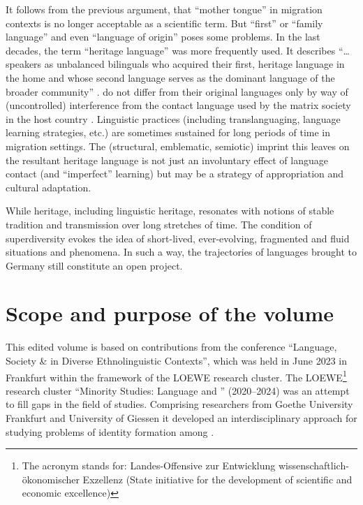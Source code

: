 \documentclass[output=paper,colorlinks,citecolor=brown]{langscibook}
\begin{document}
It follows from the previous argument, that ``mother tongue'' in migration contexts is no longer acceptable as a scientific term. But ``first'' or ``family language'' and even ``language of origin'' poses some problems. In the last decades, the term ``heritage language'' was more frequently used. It describes ``… speakers as unbalanced bilinguals who acquired their first, heritage language in the home and whose second language serves as the dominant language of the broader community'' \citep[152]{scontras_putnam2020}.  do not differ from their original languages only by way of (uncontrolled) interference from the contact language used by the matrix society in the host country \citep{polinsky2011,polinsky2018}. Linguistic practices (including translanguaging, language learning strategies, etc.) are sometimes sustained for long periods of time in migration settings. The (structural, emblematic, semiotic) imprint this leaves on the resultant heritage language is not just an involuntary effect of language contact (and ``imperfect'' learning) but may be a strategy of appropriation and cultural adaptation. 

While heritage, including linguistic heritage, resonates with notions of stable tradition and transmission over long stretches of time. The condition of superdiversity evokes the idea of short-lived, ever-evolving, fragmented and fluid situations and phenomena. In such a way, the trajectories of languages brought to Germany still constitute an open project.

\section{Scope and purpose of the volume}

This edited volume is based on contributions from the conference ``Language, Society \&  in Diverse Ethnolinguistic Contexts'', which was held in June 2023 in Frankfurt within the framework of the LOEWE research cluster.  The LOEWE\footnote{%
The acronym stands for: Landes-Offensive zur Entwicklung wissenschaftlich-ökonomischer Exzellenz (State initiative for the development of scientific and economic excellence)} research cluster ``Minority Studies: Language and '' (2020--2024) was an attempt to fill gaps in the field of  studies. Comprising researchers from Goethe University Frankfurt and University of Giessen it developed an interdisciplinary approach for studying problems of identity formation among . 
\end{document}
